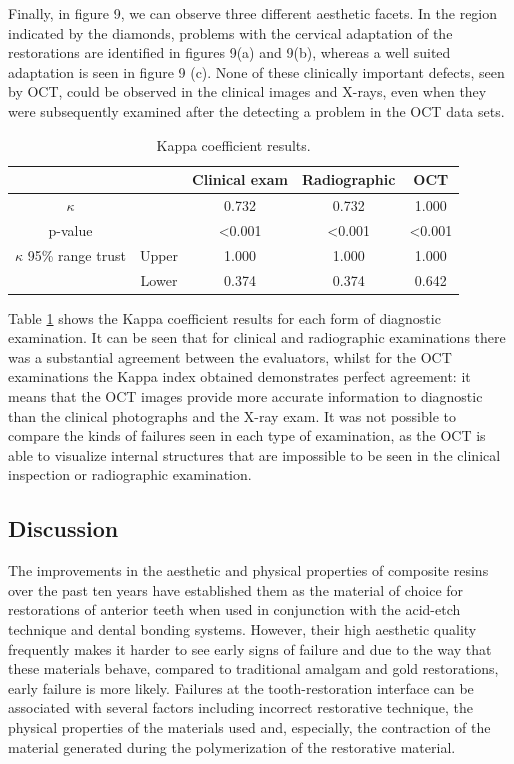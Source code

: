 \documentclass[12pt,twoside,english]{book}
\renewcommand{\~}{\perispomeni}%
\providecommand{\tabularnewline}{\\}
\numberwithin{equation}{section}
\numberwithin{figure}{section}
\begin{document}
Finally, in figure 9, we can observe three different aesthetic facets. In the region indicated by the diamonds, problems with the cervical adaptation of the restorations are identified in figures 9(a) and 9(b), whereas a well suited adaptation is seen in figure 9 (c). None of these clinically important defects, seen by OCT, could be observed in the clinical images and X-rays, even when they were subsequently examined after the detecting a problem in the OCT data sets.
\begin{table}
\noindent \centering{}\begin{tabular}{ccccc}
\hline 
 & & Clinical exam & Radiographic & OCT\tabularnewline
\hline
\hline 
$\kappa$ & & 0.732 & 0.732 & 1.000\tabularnewline
p-value & & <0.001 & <0.001 & <0.001\tabularnewline
$\kappa$ 95\% range trust & Upper & 1.000 & 1.000 & 1.000\tabularnewline
 & Lower & 0.374 & 0.374 & 0.642\tabularnewline
\hline
\end{tabular}\caption{Kappa coefficient results.\label{table:kappa results}}
\end{table}

Table \ref{table:kappa results} shows the Kappa coefficient results for each form of diagnostic examination. It can be seen that for clinical and radiographic examinations there was a substantial agreement between the evaluators, whilst for the OCT examinations the Kappa index obtained demonstrates perfect agreement: it means that the OCT images provide more accurate information to diagnostic than the clinical photographs and the X-ray exam. It was not possible to compare the kinds of failures seen in each type of examination, as the OCT is able to visualize internal structures that are impossible to be seen in the clinical inspection or radiographic examination.

\subsection{Discussion}

The improvements in the aesthetic and physical properties of composite resins over the past ten years have established them as the material of choice for restorations of anterior teeth when used in conjunction with the acid-etch technique and dental bonding systems\cite{Garoushi:2007p2191}. However, their high aesthetic quality frequently makes it harder to see early signs of failure and due to the way that these materials behave, compared to traditional amalgam and gold restorations, early failure is more likely. Failures at the tooth-restoration interface can be associated with several factors including incorrect restorative technique, the physical properties of the materials used and, especially, the contraction of the material generated during the polymerization of the restorative material.
\end{document}
